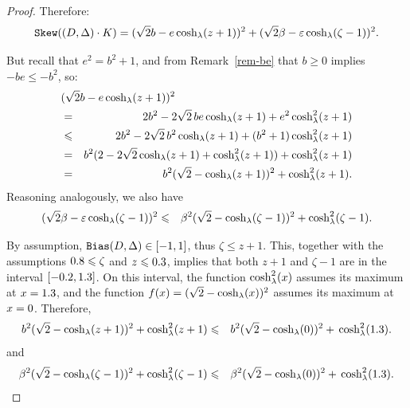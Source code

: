 \begin{proof}
\noindent
Therefore:
\begin{equation}\label{k0}
\mathtt{Skew}((D,\Delta) \cdot K)=(\sqrt{2}b -e\cosh_{\lambda}(z+1))^2 
+(\sqrt{2}\beta-\varepsilon\cosh_{\lambda}(\zeta-1))^2.
\end{equation}

\noindent
But recall that $e^2=b^2+1$, and from Remark~\ref{rem-be} that $b\geq 0$ 
implies $-be\leq -b^2$, so:
\begin{eqnarray}
\lefteqn{(\sqrt{2}b -e\cosl(z+1))^2} 
\nonumber\\
& = & 2b^2-2\sqrt{2}\,be\cosl(z+1)+ 
e^2\cosl^2(z+1) \nonumber\\
& \leq & 2b^2-2\sqrt{2}\,b^2\cosl(z+1)+ 
(b^2+1)\cosl^2(z+1) \nonumber\\
& = & b^2(2-2\sqrt{2}\cosl(z+1)+ 
\cosl^2(z+1))+\cosl^2(z+1) 
\nonumber\\
& = & b^2(\sqrt{2}-\cosl(z+1))^2+
\cosl^2(z+1).\label{k1}
\end{eqnarray}
Reasoning analogously, we also have
\begin{eqnarray}
  (\sqrt{2}\beta-\varepsilon\cosh_{\lambda}(\zeta-1))^2
  & \leqslant &
  \beta^2(\sqrt{2}-\cosh_{\lambda}(\zeta-1))^2+\cosh_{\lambda}^2(\zeta-1).
\end{eqnarray}

\noindent
By assumption, $\mathtt{Bias}(D,\Delta)\in [-1,1]$, thus 
$\zeta\leq z+1$.
This, together 
with the assumptions $\formula{\r}\leq\zeta$ 
and $z\leq\formula{-\a}$,
implies that both $z+1$ and $\zeta-1$ are in the interval
$[\formula{-\rr},\formula{-\aa}]$. On this interval, the function 
$\cosh_{\lambda}^2(x)$ assumes its maximum at $x=\pgfmathparse{
  ifthenelse((\coshl {-\rr}) <= (\coshl {-\aa}), -\aa,
  -\rr)}\pgfmathresult$, and the function 
$f(x) = (\sqrt 2 - \cosh_{\lambda}(x))^2$ assumes its maximum at 
$x=\assert{-\rr <= 0 && 0 <= -\aa}%
\pgfmathparse{
  ifthenelse((\kone{-\rr}) <= (\kone{0}) && (\kone{-\aa}) <=
  (\kone{0}), 0,  
  ifthenelse ((\kone {-\rr}) <= (\kone {-\aa}), -\aa, -\rr)}\pgfmathresult$.
Therefore, 
\begin{eqnarray}
b^2(\sqrt{2}-\cosl(z+1))^2  + \cosl^2(z+1)
& \leq &
\pgfmathparse{
  ifthenelse((\kone{-\rr}) <= (\kone{0}) && (\kone{-\aa}) <= (\kone{0}), 0,
  ifthenelse ((\kone {-\rr}) <= (\kone {-\aa}), -\aa, -\rr)
}
b^2(\sqrt{2} -\cosl(\pgfmathresult))^2 
+ 
\pgfmathparse{
  ifthenelse((\coshl {-\rr}) <= (\coshl {-\aa}), -\aa, -\rr)
}
\cosl^2(\pgfmathresult).
\end{eqnarray}
and
\begin{eqnarray}
\beta^2(\sqrt{2}-\cosl(\zeta-1))^2+\cosl^2(\zeta-1)
& \leq & 
\beta^2\pgfmathparse{
  ifthenelse((\kone{-\rr}) <= (\kone{0}) && (\kone{-\aa}) <= (\kone{0}), 0,
  ifthenelse ((\kone {-\rr}) <= (\kone {-\aa}), -\aa, -\rr)
}
(\sqrt{2} -\cosl(\pgfmathresult))^2
+
\pgfmathparse{
  ifthenelse((\coshl {-\rr}) <= (\coshl {-\aa}), -\aa, -\rr)
}
\cosl^2(\pgfmathresult).\label{k3}
\end{eqnarray}


\end{proof}
